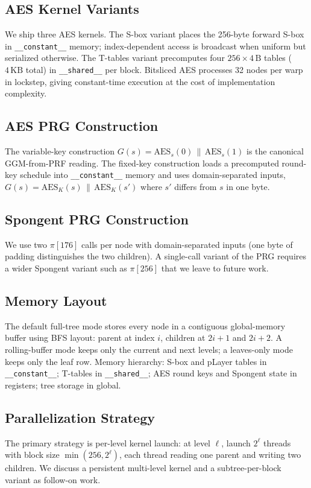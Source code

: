 \documentclass[10pt,conference]{IEEEtran}
\begin{document}
\subsection{AES Kernel Variants}
We ship three AES kernels. The S-box variant places the 256-byte forward
S-box in \texttt{\_\_constant\_\_} memory; index-dependent access is broadcast
when uniform but serialized otherwise. The T-tables variant precomputes four
$256 \times 4\,\text{B}$ tables ($4\,\text{KB}$ total) in
\texttt{\_\_shared\_\_} per block. Bitsliced AES processes 32 nodes per warp
in lockstep, giving constant-time execution at the cost of implementation
complexity.

\subsection{AES PRG Construction}
The variable-key construction $G(s) = \text{AES}_s(0)\,\|\,\text{AES}_s(1)$ is
the canonical GGM-from-PRF reading. The fixed-key construction loads a
precomputed round-key schedule into \texttt{\_\_constant\_\_} memory and uses
domain-separated inputs, $G(s) = \text{AES}_K(s)\,\|\,\text{AES}_K(s')$ where
$s'$ differs from $s$ in one byte.

\subsection{Spongent PRG Construction}
We use two $\pi[176]$ calls per node with domain-separated inputs (one byte of
padding distinguishes the two children). A single-call variant of the PRG
requires a wider Spongent variant such as $\pi[256]$ that we leave to future
work.

\subsection{Memory Layout}
The default full-tree mode stores every node in a contiguous global-memory
buffer using BFS layout: parent at index $i$, children at $2i+1$ and $2i+2$.
A rolling-buffer mode keeps only the current and next levels; a leaves-only
mode keeps only the leaf row. Memory hierarchy: S-box and pLayer tables in
\texttt{\_\_constant\_\_}; T-tables in \texttt{\_\_shared\_\_}; AES round keys
and Spongent state in registers; tree storage in global.

\subsection{Parallelization Strategy}
The primary strategy is per-level kernel launch: at level $\ell$, launch
$2^\ell$ threads with block size $\min(256, 2^\ell)$, each thread reading one
parent and writing two children. We discuss a persistent multi-level
kernel and a subtree-per-block variant as follow-on work.
\end{document}
